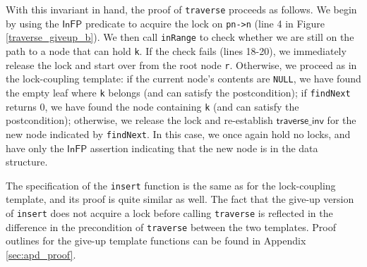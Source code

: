 \documentclass[a4paper,UKenglish,cleveref, autoref, thm-restate]{lipics-v2021}
\newcommand{\infp}{\ensuremath{\mathsf{InFP}}}
\begin{document}
With this invariant in hand, the proof of \texttt{traverse} proceeds as follows. We begin by using the $\infp$ predicate to acquire the lock on \lstinline{pn->n} (line 4 in Figure \ref{traverse_giveup_b}). We then call \lstinline{inRange} to check whether we are still on the path to a node that can hold \lstinline{k}. If the check fails (lines 18-20), we immediately release the lock and start over from the root node \lstinline{r}. Otherwise, we proceed as in the lock-coupling template: if the current node's contents are \texttt{NULL}, we have found the empty leaf where \texttt{k} belongs (and can satisfy the postcondition); if \texttt{findNext} returns 0, we have found the node containing \texttt{k} (and can satisfy the postcondition); otherwise, we release the lock and re-establish $\mathsf{traverse\_inv}$ for the new node indicated by \texttt{findNext}. In this case, we once again hold no locks, and have only the $\infp$ assertion indicating that the new node is in the data structure. %



The specification of the \lstinline{insert} function is the same as for the lock-coupling template, and its proof is quite similar as well. The fact that the give-up version of \lstinline{insert} does not acquire a lock before calling \lstinline{traverse} is reflected in the difference in the precondition of \lstinline{traverse} between the two templates. Proof outlines for the give-up template functions can be found in Appendix \ref{sec:apd_proof}.
\end{document}
